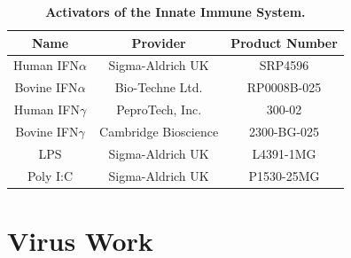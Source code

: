 \begin{table}
\centering
\begin{tabular}{ccc}
\hline
\textbf{Name} & \textbf{Provider}    & \textbf{Product Number} \\ \hline
Human IFN\(\alpha\)    & Sigma-Aldrich UK     & SRP4596                 \\ \hline
Bovine IFN\(\alpha\)   & Bio-Techne Ltd.      & RP0008B-025             \\ \hline
Human IFN\(\gamma\)    & PeproTech, Inc.      & 300-02                  \\ \hline
Bovine IFN\(\gamma\)   & Cambridge Bioscience & 2300-BG-025             \\ \hline
LPS           & Sigma-Aldrich UK     & L4391-1MG               \\ \hline
Poly I:C      & Sigma-Aldrich UK     & P1530-25MG              \\ \hline
\end{tabular}
\caption[Activators of the Innate Immune System.]{\textbf{Activators of the Innate Immune System.}}
\label{Activators of the Innate Immune System Table}
\end{table}




\section{Virus Work} \label{Virus Work}
